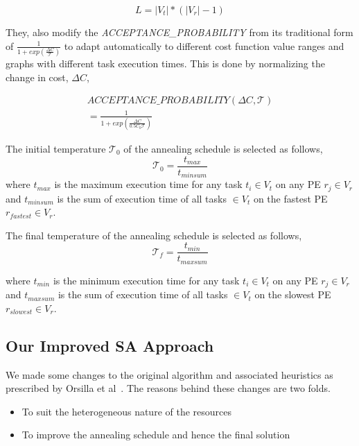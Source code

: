 \begin{equation}
L = |V_t|*(|V_r| - 1)
\end{equation}

They, also modify the \textit{ACCEPTANCE\_PROBABILITY} from its traditional form
of $\frac{1}{1+exp(\frac{\Delta C}{\mathcal{T}})}$ to adapt
automatically to different cost function value ranges and graphs with different
task execution times. This is done by normalizing the change in cost, $\Delta
C$,

\begin{equation}
  \begin{array}{c}
    ACCEPTANCE\_PROBABILITY(\Delta C, \mathcal{T}) \\ 
    = \frac{1}{1+exp(\frac{\Delta C}{0.5C_0\mathcal{T}})}
  \end{array}
\end{equation}

The initial temperature $\mathcal{T}_0$ of the annealing schedule is selected as
follows,
\begin{equation}
\mathcal{T}_0 = \frac{t_{max}}{t_{minsum}}
\end{equation}
where $t_{max}$ is the maximum execution time for any task $t_i \in V_t$ on any
PE $r_j \in V_r$ and $t_{minsum}$ is the sum of execution time of all tasks $\in
V_t$ on the fastest PE $r_{fastest} \in V_r$.

The final temperature of the annealing schedule is selected as follows,
\begin{equation}
\mathcal{T}_f = \frac{t_{min}}{t_{maxsum}}
\end{equation}

where $t_{min}$ is the minimum execution time for any task $t_i \in V_t$
on any PE $r_j \in V_r$ and $t_{maxsum}$ is the sum of execution time of
all tasks $\in V_t$ on the slowest PE $r_{slowest} \in V_r$. %

\subsection{Our Improved SA Approach}
\label{sec:our-improved-sa}

We made some changes to the original algorithm and associated heuristics as
prescribed by Orsilla et al~\cite{hors06}. The reasons behind these changes are two folds.
\begin{itemize}
\item To suit the heterogeneous nature of the resources
\item To improve the annealing schedule and hence the final solution
\end{itemize}

